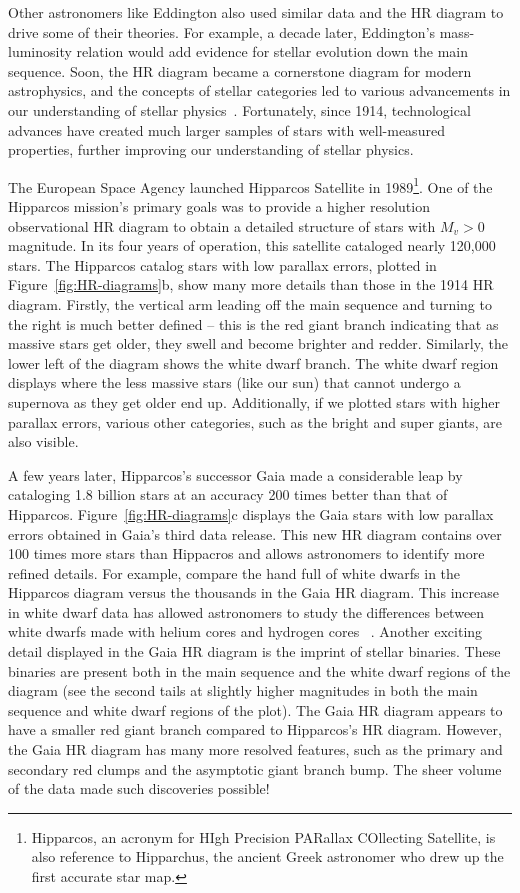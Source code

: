 Other astronomers like Eddington also used similar data and the HR diagram to drive some of their theories. 
For example, a decade later, Eddington's mass-luminosity relation would add evidence for stellar evolution down the main sequence.
Soon, the HR diagram became a cornerstone diagram for modern astrophysics, and the concepts of stellar categories led to various advancements in our understanding of stellar physics~\citeme. 
Fortunately, since 1914, technological advances have created much larger samples of stars with well-measured properties, further improving our understanding of stellar physics.


The European Space Agency launched Hipparcos Satellite in 1989\footnote{Hipparcos, an acronym for HIgh Precision PARallax COllecting Satellite, is also reference to Hipparchus, the ancient Greek astronomer who drew up the first accurate star map.}. 
One of the Hipparcos mission's primary goals was to provide a higher resolution observational HR diagram to obtain a detailed structure of stars with $M_v>0$ magnitude. 
In its four years of operation, this satellite cataloged nearly 120,000 stars. 
The Hipparcos catalog stars with low parallax errors, plotted in Figure~\ref{fig:HR-diagrams}b,  show many more details than those in the 1914 HR diagram. 
Firstly, the vertical arm leading off the main sequence and turning to the right is much better defined -- this is the red giant branch indicating that as massive stars get older, they swell and become brighter and redder.
Similarly, the lower left of the diagram shows the white dwarf branch. 
The white dwarf region displays where the less massive stars (like our sun) that cannot undergo a supernova as they get older end up. 
Additionally, if we plotted stars with higher parallax errors, various other categories, such as the bright and super giants, are also visible.

A few years later, Hipparcos's successor Gaia made a considerable leap by cataloging 1.8 billion stars at an accuracy 200 times better than that of Hipparcos. 
Figure~\ref{fig:HR-diagrams}c displays the Gaia stars with low parallax errors obtained in Gaia's third data release. 
This new HR diagram contains over 100 times more stars than Hippacros and allows astronomers to identify more refined details. 
For example, compare the hand full of white dwarfs in the Hipparcos diagram versus the thousands in the Gaia HR diagram.
This increase in white dwarf data has allowed astronomers to study the differences between white dwarfs made with helium cores and hydrogen cores ~\citeme. 
Another exciting detail displayed in the Gaia HR diagram is the imprint of stellar binaries.
These binaries are present both in the main sequence and the white dwarf regions of the diagram (see the second tails at slightly higher magnitudes in both the main sequence and white dwarf regions of the plot).
The Gaia HR diagram appears to have a smaller red giant branch compared to Hipparcos's HR diagram. However, the Gaia HR diagram has many more resolved features, such as the primary and secondary red clumps and the asymptotic giant branch bump. 
The sheer volume of the data made such discoveries possible! 

